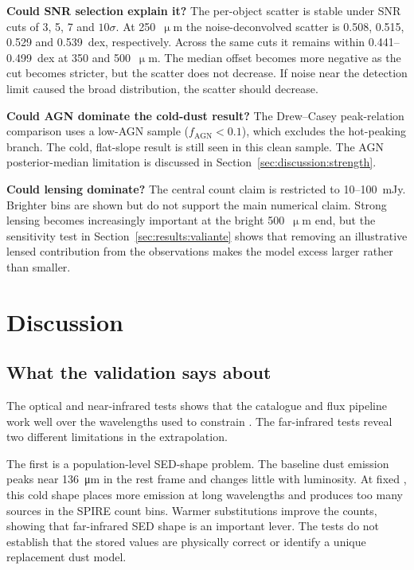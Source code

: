 \documentclass[12pt,a4paper]{article}
\begin{document}
\textbf{Could SNR selection explain it?} The per-object scatter is stable under SNR
cuts of 3, 5, 7 and $10\sigma$. At 250~$\upmu$m the noise-deconvolved scatter is
0.508, 0.515, 0.529 and \SI{0.539}{dex}, respectively. Across the same cuts it remains
within 0.441--\SI{0.499}{dex} at 350 and 500~$\upmu$m. The median offset becomes more
negative as the cut becomes stricter, but the scatter does not decrease. If noise near
the detection limit caused the broad distribution, the scatter should decrease.

\textbf{Could AGN dominate the cold-dust result?} The Drew--Casey peak-relation
comparison uses a low-AGN sample ($f_\mathrm{AGN} < 0.1$), which excludes the
hot-peaking branch. The cold, flat-slope result is still seen in this clean sample. The AGN
posterior-median limitation is discussed in
Section~\ref{sec:discussion:strength}.

\textbf{Could lensing dominate?} The central count claim is restricted to
10--\SI{100}{mJy}. Brighter bins are shown but do not support the main numerical claim.
Strong lensing becomes increasingly important at the bright 500~$\upmu$m end, but the
sensitivity test in Section~\ref{sec:results:valiante} shows that removing an illustrative
lensed contribution from the observations makes the model excess larger rather than smaller.

\section{Discussion}
\label{sec:discussion}

\subsection{What the validation says about \popcosmos{}}
\label{sec:discussion:summary}

The optical and near-infrared tests shows that the catalogue and flux pipeline work
well over the wavelengths used to constrain \popcosmos{}. The far-infrared tests reveal
two different limitations in the extrapolation.

The first is a population-level SED-shape problem. The baseline dust emission peaks near
\SI{136}{\um} in the rest frame and changes little with luminosity. At fixed \LIR{}, this
cold shape places more emission at long wavelengths and produces too many sources in the
SPIRE count bins. Warmer substitutions improve the counts, showing that far-infrared SED
shape is an important lever. The tests do not establish that the stored \LIR{} values are
physically correct or identify a unique replacement dust model.
\end{document}
